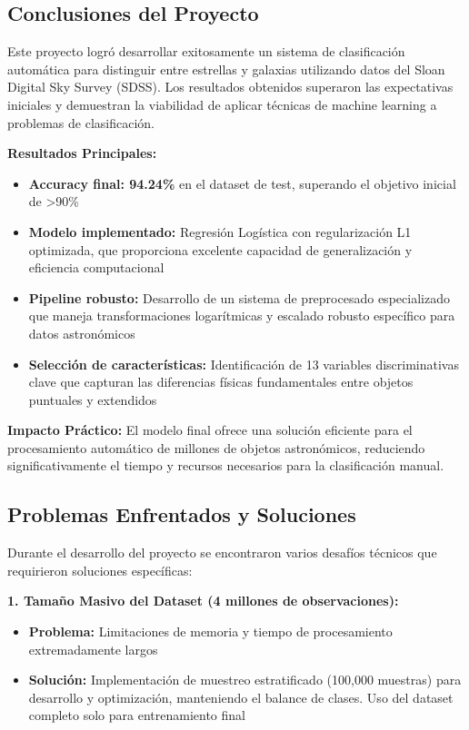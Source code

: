 \documentclass{article}
\begin{document}
\subsection{Conclusiones del Proyecto}

Este proyecto logró desarrollar exitosamente un sistema de clasificación automática para distinguir entre estrellas y galaxias utilizando datos del Sloan Digital Sky Survey (SDSS). Los resultados obtenidos superaron las expectativas iniciales y demuestran la viabilidad de aplicar técnicas de machine learning a problemas de clasificación.

\textbf{Resultados Principales:}
\begin{itemize}
    \item \textbf{Accuracy final: 94.24\%} en el dataset de test, superando el objetivo inicial de >90\%
    \item \textbf{Modelo implementado:} Regresión Logística con regularización L1 optimizada, que proporciona excelente capacidad de generalización y eficiencia computacional
    \item \textbf{Pipeline robusto:} Desarrollo de un sistema de preprocesado especializado que maneja transformaciones logarítmicas y escalado robusto específico para datos astronómicos
    \item \textbf{Selección de características:} Identificación de 13 variables discriminativas clave que capturan las diferencias físicas fundamentales entre objetos puntuales y extendidos
\end{itemize}

\textbf{Impacto Práctico:}
El modelo final ofrece una solución eficiente para el procesamiento automático de millones de objetos astronómicos, reduciendo significativamente el tiempo y recursos necesarios para la clasificación manual.

\subsection{Problemas Enfrentados y Soluciones}

Durante el desarrollo del proyecto se encontraron varios desafíos técnicos que requirieron soluciones específicas:

\textbf{1. Tamaño Masivo del Dataset (4 millones de observaciones):}
\begin{itemize}
    \item \textbf{Problema:} Limitaciones de memoria y tiempo de procesamiento extremadamente largos
    \item \textbf{Solución:} Implementación de muestreo estratificado (100,000 muestras) para desarrollo y optimización, manteniendo el balance de clases. Uso del dataset completo solo para entrenamiento final
\end{itemize}
\end{document}
